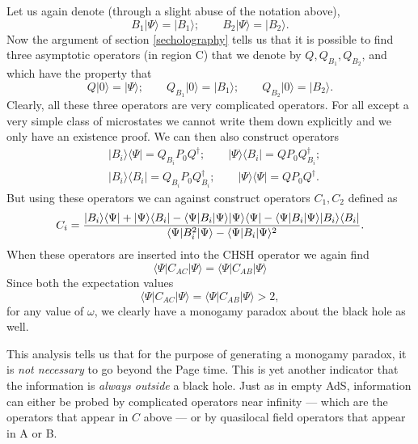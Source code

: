 \documentclass[12pt]{article}
\newcommand{\be}{\begin{equation}}
\newcommand{\ee}{\end{equation}}
\def\projvac{{\cal P}_{\Omega}}
\def\projvac{P_0}
\begin{document}
Let us again denote (through a slight abuse of the notation above),
\be
B_1 | \Psi \rangle = |B_1 \rangle; \qquad B_2 |\Psi \rangle = |B_2 \rangle.
\ee
Now the argument of section \ref{secholography} tells us that it is possible to find three asymptotic operators (in region C) that we denote by $Q, Q_{B_1}, Q_{B_2}$, and which have the property that
\be
Q | 0 \rangle = |\Psi \rangle; \qquad Q_{B_1} | 0 \rangle = |B_1 \rangle ; \qquad Q_{B_2} | 0 \rangle = |B_2 \rangle.
\ee
Clearly, all these three operators are very complicated operators. For all except a very simple class of microstates we cannot write them down explicitly and we only have an existence proof.  We can then also construct
operators
\be
\begin{split}
&|B_i \rangle \langle \Psi| = Q_{B_i} \projvac Q^{\dagger}; \qquad |\Psi \rangle \langle B_i| = Q \projvac Q_{B_i}^{\dagger}; \\
&|B_i \rangle \langle B_i | = Q_{B_i} \projvac Q_{B_i}^{\dagger}; \qquad |\Psi \rangle \langle \Psi| = Q \projvac Q^{\dagger}.
\end{split}
\ee
But using these operators we can against construct operators $C_1, C_2$ defined as
\be
C_i =  { |B_i \rangle \langle \Psi | + |\Psi \rangle \langle B_i |  - \langle \Psi | B_i | \Psi \rangle |\Psi \rangle \langle \Psi |  - \langle \Psi | B_i | \Psi \rangle |B_i \rangle \langle B_i|  \over  \langle \Psi | B_i^2 | \Psi \rangle - \langle \Psi | B_i| \Psi \rangle^2 }.
\ee
When these operators are inserted into the CHSH operator we again find
\be
\langle \Psi | C_{AC} |\Psi \rangle =  \langle \Psi | C_{AB} |\Psi \rangle
\ee
Since both the expectation values
\be
\langle \Psi | C_{AC} |\Psi \rangle = \langle \Psi | C_{AB} |\Psi \rangle > 2,
\ee
for any value of $\omega$, we clearly have a monogamy paradox about the black hole as well.



This analysis tells us that for the purpose of generating a monogamy paradox,  it is {\em not necessary} to go beyond the Page time. This is yet another indicator that the information is {\em always outside} a black hole. Just as in empty AdS, information can either be probed by complicated operators near infinity --- which are the operators that appear in $C$ above --- or by quasilocal field operators that appear in A or B.
\end{document}

